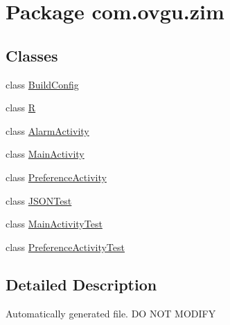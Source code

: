 \hypertarget{namespacecom_1_1ovgu_1_1zim}{\section{Package com.\-ovgu.\-zim}
\label{namespacecom_1_1ovgu_1_1zim}
}
\subsection*{Classes}
\begin{DoxyCompactItemize}
\item 
class \hyperlink{classcom_1_1ovgu_1_1zim_1_1_build_config}{Build\-Config}
\item 
class \hyperlink{classcom_1_1ovgu_1_1zim_1_1_r}{R}
\item 
class \hyperlink{classcom_1_1ovgu_1_1zim_1_1_alarm_activity}{Alarm\-Activity}
\item 
class \hyperlink{classcom_1_1ovgu_1_1zim_1_1_main_activity}{Main\-Activity}
\item 
class \hyperlink{classcom_1_1ovgu_1_1zim_1_1_preference_activity}{Preference\-Activity}
\item 
class \hyperlink{classcom_1_1ovgu_1_1zim_1_1_j_s_o_n_test}{J\-S\-O\-N\-Test}
\item 
class \hyperlink{classcom_1_1ovgu_1_1zim_1_1_main_activity_test}{Main\-Activity\-Test}
\item 
class \hyperlink{classcom_1_1ovgu_1_1zim_1_1_preference_activity_test}{Preference\-Activity\-Test}
\end{DoxyCompactItemize}


\subsection{Detailed Description}
Automatically generated file. D\-O N\-O\-T M\-O\-D\-I\-F\-Y 